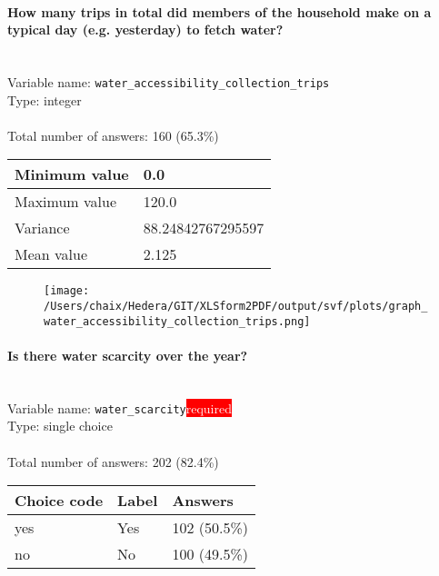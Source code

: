 \documentclass[11.5pt, a4paper]{scrartcl}
\begin{document}
\paragraph{How many trips in total did members of the household make on a typical day (e.g. yesterday) to fetch water?}
\  \\Variable name: \texttt{water\_accessibility\_collection\_trips}\\
Type: integer\\
\\Total number of answers: 160 (65.3\%)
\\[0.2em] \begin{tabular}{p{4cm}|p{8cm}}
Minimum value &0.0 \\
\hline
\cellcolor{mygray} Maximum value & \cellcolor{mygray}120.0 \\
\hline
Variance &88.24842767295597 \\
\hline
\cellcolor{mygray} Mean value & \cellcolor{mygray}2.125 \\
\hline
\end{tabular}
\begin{figure}[H]
\centering
\texttt{[image: /Users/chaix/Hedera/GIT/XLSform2PDF/output/svf/plots/graph\_water\_accessibility\_collection\_trips.png]}
\end{figure}
\paragraph{Is there water scarcity over the year?}
\  \\Variable name: \texttt{water\_scarcity}\hfill\colorbox{red}{\small{\textcolor{white}{required}}}\\
 Type: single choice\\
\\Total number of answers: 202 (82.4\%)
\\[0.2em] \begin{tabular}{p{4cm}|p{8cm}|p{3cm}}
Choice code & Label & Answers \\
\hline
yes & Yes& \cellcolor{color2}102 (50.5\%)\\
\cellcolor{mygray} no & \cellcolor{mygray}No & \cellcolor{color2}100 (49.5\%)\\
\end{tabular}
\end{document}
